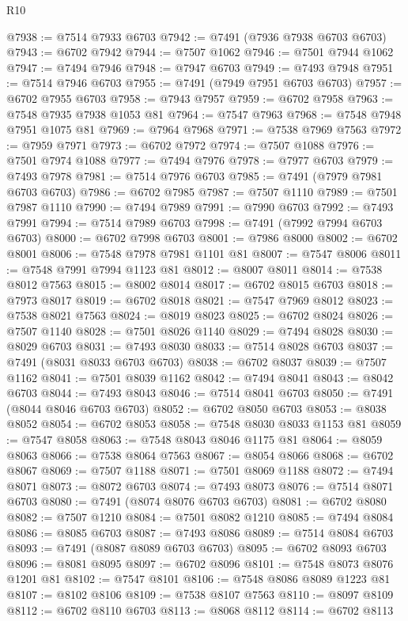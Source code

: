 \begin{lexlean}{R10}
\begin{coremodule}
@7938 := @7514 @7933 @6703
@7942 := @7491 (@7936 @7938 @6703 @6703)
@7943 := @6702 @7942
@7944 := @7507 @1062
@7946 := @7501 @7944 @1062
@7947 := @7494 @7946
@7948 := @7947 @6703
@7949 := @7493 @7948
@7951 := @7514 @7946 @6703
@7955 := @7491 (@7949 @7951 @6703 @6703)
@7957 := @6702 @7955 @6703
@7958 := @7943 @7957
@7959 := @6702 @7958
@7963 := @7548 @7935 @7938 @1053 @81
@7964 := @7547 @7963
@7968 := @7548 @7948 @7951 @1075 @81
@7969 := @7964 @7968
@7971 := @7538 @7969 @7563
@7972 := @7959 @7971
@7973 := @6702 @7972
@7974 := @7507 @1088
@7976 := @7501 @7974 @1088
@7977 := @7494 @7976
@7978 := @7977 @6703
@7979 := @7493 @7978
@7981 := @7514 @7976 @6703
@7985 := @7491 (@7979 @7981 @6703 @6703)
@7986 := @6702 @7985
@7987 := @7507 @1110
@7989 := @7501 @7987 @1110
@7990 := @7494 @7989
@7991 := @7990 @6703
@7992 := @7493 @7991
@7994 := @7514 @7989 @6703
@7998 := @7491 (@7992 @7994 @6703 @6703)
@8000 := @6702 @7998 @6703
@8001 := @7986 @8000
@8002 := @6702 @8001
@8006 := @7548 @7978 @7981 @1101 @81
@8007 := @7547 @8006
@8011 := @7548 @7991 @7994 @1123 @81
@8012 := @8007 @8011
@8014 := @7538 @8012 @7563
@8015 := @8002 @8014
@8017 := @6702 @8015 @6703
@8018 := @7973 @8017
@8019 := @6702 @8018
@8021 := @7547 @7969 @8012
@8023 := @7538 @8021 @7563
@8024 := @8019 @8023
@8025 := @6702 @8024
@8026 := @7507 @1140
@8028 := @7501 @8026 @1140
@8029 := @7494 @8028
@8030 := @8029 @6703
@8031 := @7493 @8030
@8033 := @7514 @8028 @6703
@8037 := @7491 (@8031 @8033 @6703 @6703)
@8038 := @6702 @8037
@8039 := @7507 @1162
@8041 := @7501 @8039 @1162
@8042 := @7494 @8041
@8043 := @8042 @6703
@8044 := @7493 @8043
@8046 := @7514 @8041 @6703
@8050 := @7491 (@8044 @8046 @6703 @6703)
@8052 := @6702 @8050 @6703
@8053 := @8038 @8052
@8054 := @6702 @8053
@8058 := @7548 @8030 @8033 @1153 @81
@8059 := @7547 @8058
@8063 := @7548 @8043 @8046 @1175 @81
@8064 := @8059 @8063
@8066 := @7538 @8064 @7563
@8067 := @8054 @8066
@8068 := @6702 @8067
@8069 := @7507 @1188
@8071 := @7501 @8069 @1188
@8072 := @7494 @8071
@8073 := @8072 @6703
@8074 := @7493 @8073
@8076 := @7514 @8071 @6703
@8080 := @7491 (@8074 @8076 @6703 @6703)
@8081 := @6702 @8080
@8082 := @7507 @1210
@8084 := @7501 @8082 @1210
@8085 := @7494 @8084
@8086 := @8085 @6703
@8087 := @7493 @8086
@8089 := @7514 @8084 @6703
@8093 := @7491 (@8087 @8089 @6703 @6703)
@8095 := @6702 @8093 @6703
@8096 := @8081 @8095
@8097 := @6702 @8096
@8101 := @7548 @8073 @8076 @1201 @81
@8102 := @7547 @8101
@8106 := @7548 @8086 @8089 @1223 @81
@8107 := @8102 @8106
@8109 := @7538 @8107 @7563
@8110 := @8097 @8109
@8112 := @6702 @8110 @6703
@8113 := @8068 @8112
@8114 := @6702 @8113

\end{coremodule}
\end{lexlean}
